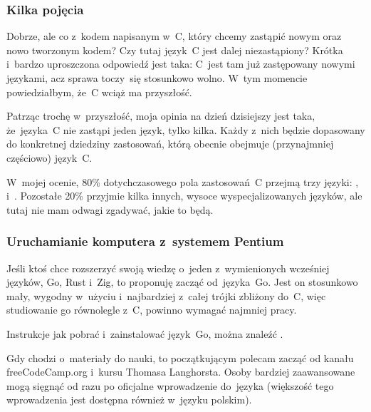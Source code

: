 \documentclass[10pt,t]{beamer}
\begin{document}
\begin{frame}
  \frametitle{Kilka pojęcia}


  Dobrze, ale co z~kodem napisanym w~C, który chcemy zastąpić nowym oraz
  nowo tworzonym kodem? Czy tutaj język~C jest dalej niezastąpiony? Krótka
  i~bardzo uproszczona odpowiedź jest taka: C~jest tam już zastępowany
  nowymi językami, acz sprawa toczy~się stosunkowo wolno. W~tym momencie
  powiedziałbym, że~C wciąż ma przyszłość.

  Patrząc trochę w~przyszłość, moja opinia na dzień dzisiejszy jest taka,
  że~języka~C \alert{nie} zastąpi jeden język, tylko kilka. Każdy z~nich
  będzie dopasowany do konkretnej dziedziny
  zastosowań, którą obecnie obejmuje (przynajmniej częściowo) język~C.

  W~mojej ocenie, 80\% dotychczasowego pola zastosowań~C przejmą trzy
  języki: ,
  i~. Pozostałe 20\% przyjmie kilka
  innych, wysoce wyspecjalizowanych języków, ale tutaj nie mam odwagi
  zgadywać, jakie to będą.

\end{frame}





\begin{frame}
  \frametitle{Uruchamianie komputera z~systemem Pentium}


  Jeśli ktoś chce rozszerzyć swoją wiedzę o~jeden z~wymienionych wcześniej
  języków, Go, Rust i~Zig, to proponuję zacząć od~języka~Go. Jest on
  stosunkowo mały, wygodny w~użyciu i~najbardziej z~całej trójki zbliżony
  do~C, więc studiowanie go równolegle z~C, powinno wymagać najmniej pracy.

  Instrukcje jak pobrać i~zainstalować język~Go, można znaleźć
  .

  Gdy chodzi o~materiały do nauki, to początkującym polecam zacząć od
   kanału freeCodeCamp.org
  i~kursu
   Thomasa Langhorsta. Osoby bardziej
  zaawansowane mogą sięgnąć od razu po oficjalne wprowadzenie do~języka
  (większość tego wprowadzenia jest dostępna również w~języku polskim).

\end{frame}
\end{document}

